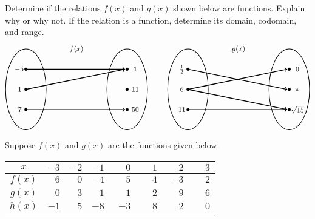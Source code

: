 \documentclass[11pt,letterpaper]{article}
\begin{document}
\prob Determine if the relations $f(x)$ and $g(x)$ shown below are functions. Explain why or why not. If the relation is a function, determine its domain, codomain, and range. 
	\[
	\begin{tikzpicture}
	\node at (2.5,2) {$f(x)$};
	\draw[line width=0.03cm] (0,0) circle (1 and 2);
	\draw[line width=0.03cm] (5,0) circle (1 and 2);
	
	\draw[fill=black] (0,1) circle (0.07);
	\draw[fill=black] (0,0) circle (0.07);
	\draw[fill=black] (0,-1) circle (0.07);
	
	\draw[fill=black] (5,1) circle (0.07);
	\draw[fill=black] (5,0) circle (0.07);
	\draw[fill=black] (5,-1) circle (0.07);
	
	\draw[line width=0.04cm,->] (0,1) -- (4.9,1);
	\draw[line width=0.04cm,->] (0,0) -- (4.9,1);
	\draw[line width=0.04cm,->] (0,-1) -- (4.9,-1);
	
	\node at (-0.3,1) {$\!-5$};
	\node at (-0.3,0) {$1$};
	\node at (-0.3,-1) {$7$};
	
	\node at (5.4,1) {$1$};
	\node at (5.4,0) {$11$};
	\node at (5.4,-1) {$50$};
	
	\tikzset{shift={(8,0)}}
	\node at (2.5,2) {$g(x)$};
	\draw[line width=0.03cm] (0,0) circle (1 and 2);
	\draw[line width=0.03cm] (5,0) circle (1 and 2);
	
	\draw[fill=black] (0,1) circle (0.07);
	\draw[fill=black] (0,0) circle (0.07);
	\draw[fill=black] (0,-1) circle (0.07);
	
	\draw[fill=black] (5,1) circle (0.07);
	\draw[fill=black] (5,0) circle (0.07);
	\draw[fill=black] (5,-1) circle (0.07);
	
	\draw[line width=0.04cm,->] (0,1) -- (4.9,0);
	\draw[line width=0.04cm,->] (0,0) -- (4.9,1);
	\draw[line width=0.04cm,->] (0,0) -- (4.9,-1);
	\draw[line width=0.04cm,->] (0,-1) -- (4.9,-1);
	
	\node at (-0.3,1) {$\frac{1}{2}$};
	\node at (-0.3,0) {$6$};
	\node at (-0.3,-1) {$11$};
	
	\node at (5.4,1) {$0$};
	\node at (5.4,0) {$\pi$};
	\node at (5.4,-1) {$\sqrt{15}$};
	\end{tikzpicture}
	\] \pspace


\prob Suppose $f(x)$ and $g(x)$ are the functions given below. 
        \begin{table}[H]
        \centering
        \begin{tabular}{| c || r | r | r | r | r | r | r |} \hline
	$x$ & $-3$ & $-2$ & $-1$ & $\phantom{-}0$ & $\phantom{-}1$ & $\phantom{-}2$ & $\phantom{-}3$ \\ \hline \hline
	$f(x)$ & $6$ & $0$ & $-4$ & $5$ & $4$ & $-3$ & $2$ \\ \hline
	$g(x)$ & $0$ & $3$ & $1$ & $1$ & $2$ & $9$ & $6$ \\ \hline
	$h(x)$ & $-1$ & $5$ & $-8$ & $-3$ & $8$ & $2$ & $0$ \\ \hline
        \end{tabular}
        \end{table}
\end{document}
